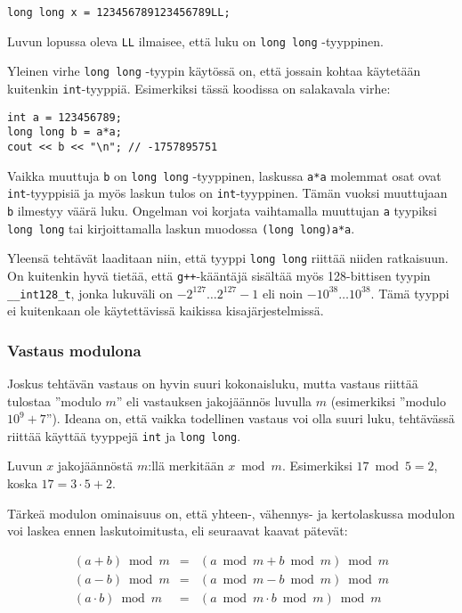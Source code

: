 \begin{lstlisting}
long long x = 123456789123456789LL;
\end{lstlisting}
Luvun lopussa oleva \texttt{LL}
ilmaisee, että luku on \texttt{long long} -tyyppinen.

Yleinen virhe \texttt{long long} -tyypin käytössä on,
että jossain kohtaa käytetään kuitenkin \texttt{int}-tyyppiä.
Esimerkiksi tässä koodissa on salakavala virhe:

\begin{lstlisting}
int a = 123456789;
long long b = a*a;
cout << b << "\n"; // -1757895751
\end{lstlisting}

Vaikka muuttuja \texttt{b} on \texttt{long long} -tyyppinen,
laskussa \texttt{a*a} molemmat osat ovat \texttt{int}-tyyppisiä
ja myös laskun tulos on \texttt{int}-tyyppinen.
Tämän vuoksi muuttujaan \texttt{b} ilmestyy väärä luku.
Ongelman voi korjata vaihtamalla muuttujan \texttt{a}
tyypiksi \texttt{long long} tai kirjoittamalla
laskun muodossa \texttt{(long long)a*a}.

Yleensä tehtävät laaditaan niin, että tyyppi
\texttt{long long} riittää niiden ratkaisuun.
On kuitenkin hyvä tietää, että \texttt{g++}-kääntäjä sisältää myös 128-bittisen
tyypin \texttt{\_\_int128\_t}, jonka lukuväli on
$-2^{127} \ldots 2^{127}-1$ eli noin $-10^{38} \ldots 10^{38}$.
Tämä tyyppi ei kuitenkaan ole käytettävissä kaikissa kisajärjestelmissä.

\subsubsection{Vastaus modulona}


Joskus tehtävän vastaus on hyvin suuri kokonaisluku,
mutta vastaus riittää tulostaa ''modulo $m$''
eli vastauksen jakojäännös luvulla $m$
(esimerkiksi ''modulo $10^9+7$'').
Ideana on, että vaikka todellinen vastaus
voi olla suuri luku,
tehtävässä riittää käyttää tyyppejä \texttt{int} ja \texttt{long long}.

Luvun $x$ jakojäännöstä $m$:llä
merkitään $x \bmod m$.
Esimerkiksi $17 \bmod 5 = 2$,
koska $17 = 3 \cdot 5 + 2$.

Tärkeä modulon ominaisuus on,
että yhteen-, vähennys- ja kertolaskussa
modulon voi laskea ennen laskutoimitusta,
eli seuraavat kaavat pätevät:

\[
\begin{array}{rcr}
(a+b) \bmod m & = & (a \bmod m + b \bmod m) \bmod m \\
(a-b) \bmod m & = & (a \bmod m - b \bmod m) \bmod m \\
(a \cdot b) \bmod m & = & (a \bmod m \cdot b \bmod m) \bmod m
\end{array}
\]

